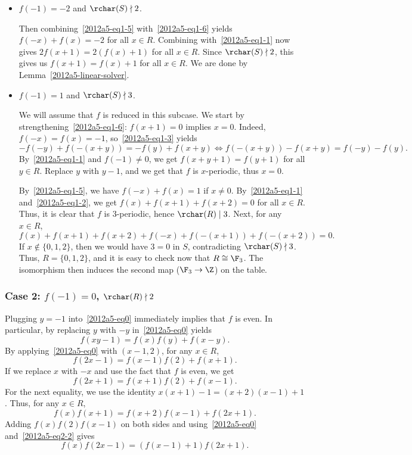 \begin{itemize}

    \item
    $f(-1) = -2$ and $\rchar(S) \nmid 2$.
    
    Then combining~\eqref{2012a5-eq1-5} with~\eqref{2012a5-eq1-6} yields $f(-x) + f(x) = -2$ for all $x \in R$.
    Combining with~\eqref{2012a5-eq1-1} now gives $2 f(x + 1) = 2 (f(x) + 1)$ for all $x \in R$.
    Since $\rchar(S) \nmid 2$, this gives us $f(x + 1) = f(x) + 1$ for all $x \in R$.
    We are done by Lemma~\ref{2012a5-linear-solver}.


    \item
    $f(-1) = 1$ and $\rchar(S) \nmid 3$.

    We will assume that $f$ is reduced in this subcase.
    We start by strengthening~\eqref{2012a5-eq1-6}: $f(x + 1) = 0$ implies $x = 0$.
    Indeed, $f(-x) = f(x) = -1$, so~\eqref{2012a5-eq1-3} yields
    \[ -f(-y) + f(-(x + y)) = -f(y) + f(x + y) \iff f(-(x + y)) - f(x + y) = f(-y) - f(y). \]
    By~\eqref{2012a5-eq1-1} and $f(-1) \neq 0$, we get $f(x + y + 1) = f(y + 1)$ for all $y \in R$.
    Replace $y$ with $y - 1$, and we get that $f$ is $x$-periodic, thus $x = 0$.

    By~\eqref{2012a5-eq1-5}, we have $f(-x) + f(x) = 1$ if $x \neq 0$.
    By~\eqref{2012a5-eq1-1} and~\eqref{2012a5-eq1-2}, we get $f(x) + f(x + 1) + f(x + 2) = 0$ for all $x \in R$.
    Thus, it is clear that $f$ is $3$-periodic, hence $\rchar(R) \mid 3$.
    Next, for any $x \in R$,
    \[ f(x) + f(x + 1) + f(x + 2) + f(-x) + f(-(x + 1)) + f(-(x + 2)) = 0. \]
    If $x \notin \{0, 1, 2\}$, then we would have $3 = 0$ in $S$, contradicting $\rchar(S) \nmid 3$.
    Thus, $R = \{0, 1, 2\}$, and it is easy to check now that $R \cong \F_3$.
    The isomorphism then induces the second map ($\F_3 \to \Z$) on the table.

\end{itemize}




\newpage
\subsubsection*{Case 2: $f(-1) = 0$, $\rchar(R) \nmid 2$}

Plugging $y = -1$ into~\eqref{2012a5-eq0} immediately implies that $f$ is even.
In particular, by replacing $y$ with $-y$ in~\eqref{2012a5-eq0} yields
\[ f(xy - 1) = f(x) f(y) + f(x - y). \tag{2.1}\label{2012a5-eq2-1} \]
By applying~\eqref{2012a5-eq0} with $(x - 1, 2)$, for any $x \in R$,
\[ f(2x - 1) = f(x - 1) f(2) + f(x + 1). \tag{2.2}\label{2012a5-eq2-2} \]
If we replace $x$ with $-x$ and use the fact that $f$ is even, we get
\[ f(2x + 1) = f(x + 1) f(2) + f(x - 1). \tag{2.3}\label{2012a5-eq2-3} \]
For the next equality, we use the identity $x(x + 1) - 1 = (x + 2)(x - 1) + 1$.
Thus, for any $x \in R$,
\[ f(x) f(x + 1) = f(x + 2) f(x - 1) + f(2x + 1). \]
Adding $f(x) f(2) f(x - 1)$ on both sides and using~\eqref{2012a5-eq0} and~\eqref{2012a5-eq2-2} gives
\[ f(x) f(2x - 1) = (f(x - 1) + 1) f(2x + 1). \tag{2.4}\label{2012a5-eq2-4} \]


